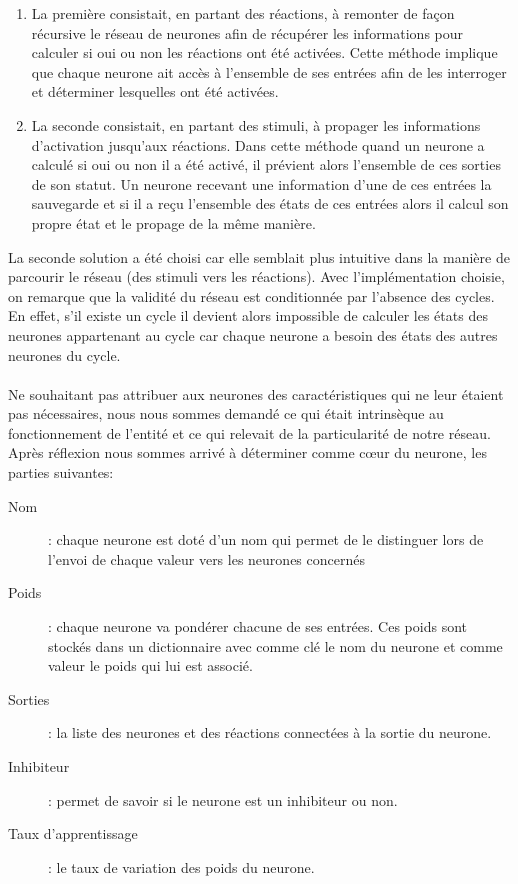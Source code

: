 \begin{enumerate}
  \item La première consistait, en partant des réactions, à remonter de façon
    récursive le réseau de neurones afin de récupérer les informations pour
    calculer si oui ou non les réactions ont été activées. Cette méthode implique
    que chaque neurone ait accès à l'ensemble de ses entrées afin de les
    interroger et déterminer lesquelles ont été activées.
  \item La seconde consistait, en partant des stimuli, à propager les informations
    d'activation jusqu'aux réactions. Dans cette méthode quand un neurone a calculé
    si oui ou non il a été activé, il prévient alors l'ensemble de ces sorties de
    son statut. Un neurone recevant une information d'une de ces entrées la
    sauvegarde et si il a reçu l'ensemble des états de ces entrées alors il calcul
    son propre état et le propage de la même manière.
\end{enumerate}

La seconde solution a été choisi car elle semblait plus intuitive dans la
manière de parcourir le réseau (des stimuli vers les réactions). Avec
l'implémentation choisie, on remarque que la validité du réseau est
conditionnée par l'absence des cycles. En effet, s'il existe un cycle il
devient alors impossible de calculer les états des neurones appartenant au
cycle car chaque neurone a besoin des états des autres neurones du cycle.

\paragraph{}
Ne souhaitant pas attribuer aux neurones des caractéristiques qui ne leur étaient
pas nécessaires, nous nous sommes demandé ce qui était intrinsèque au
fonctionnement de l'entité et ce qui relevait de la particularité de notre
réseau. Après réflexion nous sommes arrivé à déterminer comme cœur du neurone, les
parties suivantes:\\

\begin{description}
  \item[Nom]: chaque neurone est doté d'un nom qui permet de le distinguer
    lors de l'envoi de chaque valeur vers les neurones concernés
  \item[Poids]: chaque neurone va pondérer chacune de ses entrées. Ces poids
    sont stockés dans un dictionnaire avec comme clé le nom du neurone et
    comme valeur le poids qui lui est associé.
  \item[Sorties]: la liste des neurones et des réactions connectées à la
    sortie du neurone.
  \item[Inhibiteur]: permet de savoir si le neurone est un inhibiteur ou non.
  \item[Taux d'apprentissage]: le taux de variation des poids du neurone.
\end{description}

\paragraph{}


